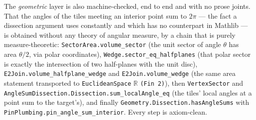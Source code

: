 \documentclass[11pt,reqno]{amsart}
\theoremstyle{plain}
\theoremstyle{definition}
\newcommand{\R}{\mathbb{R}}
\begin{document}
The \emph{geometric} layer is also machine-checked, end to end and with no prose joints. That the
angles of the tiles meeting an interior point sum to $2\pi$ --- the fact a dissection argument uses
constantly and which has no counterpart in Mathlib --- is obtained without any theory of angular
measure, by a chain that is purely measure-theoretic:
\texttt{SectorArea.volume\_sector} (the unit sector of angle $\theta$
has area $\theta/2$, via polar coordinates), \texttt{Wedge.sector\_eq\_halfplanes} (that polar
sector is exactly the intersection of two half-planes with the unit disc),
\texttt{E2Join.volume\_halfplane\_wedge} and \texttt{E2Join.volume\_wedge} (the same area
statement transported to \texttt{EuclideanSpace} $\R$ \texttt{(Fin 2)}), then
\texttt{VertexSector} and \texttt{AngleSumDissection.Dissection.sum\_localAngle\_eq} (the tiles'
local angles at a point sum to the target's), and finally
\texttt{Geometry.Dissection.hasAngleSums} with
\texttt{PinPlumbing.pin\_angle\_sum\_interior}. Every step is axiom-clean.
\end{document}

